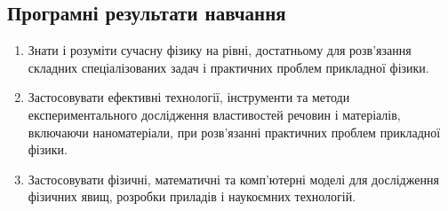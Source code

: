 \documentclass{Syllabus}
\begin{document}
\subsection*{Програмні результати навчання}

\begin{enumerate}
    \item [ПРН 1:] Знати і розуміти сучасну фізику на рівні, достатньому для розв’язання складних спеціалізованих задач і практичних проблем прикладної фізики.
    \item [ПРН 3:] Застосовувати ефективні технології, інструменти та методи експериментального дослідження властивостей речовин і матеріалів, включаючи наноматеріали, при розв’язанні практичних проблем прикладної фізики.
    \item [ПРН 4:] Застосовувати фізичні, математичні та комп'ютерні моделі для дослідження фізичних явищ, розробки приладів і наукоємних технологій.

\end{enumerate}
\end{document}
